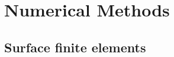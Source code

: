 
\newpage
\section{Numerical Methods}%
\label{sec:numerical_methods}

\subsection{Surface finite elements}%
\label{sub:surface_finite_elements}








